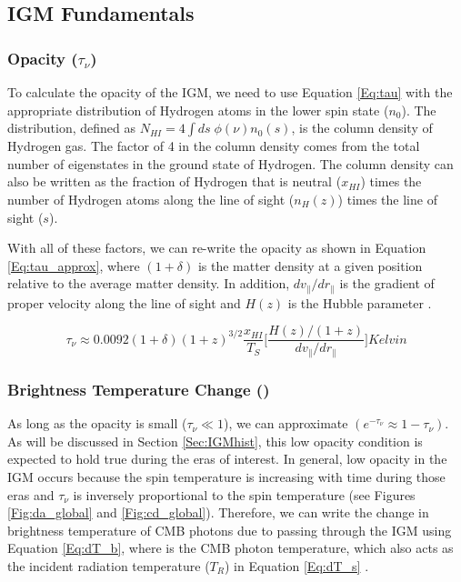 \subsection{IGM Fundamentals}

\subsubsection{Opacity ($\tau_\nu$)}

To calculate the opacity of the IGM, we need to use Equation \ref{Eq:tau} with the appropriate distribution of Hydrogen atoms in the lower spin state ($n_0$). The distribution, defined as $N_{HI} = 4 \int ds \; \phi(\nu) n_0(s)$, is the column density of Hydrogen gas. The factor of 4 in the column density comes from the total number of eigenstates in the ground state of Hydrogen. The column density can also be written as the fraction of Hydrogen that is neutral ($x_{HI}$) times the number of Hydrogen atoms along the line of sight ($n_H (z)$) times the line of sight ($s$).

With all of these factors, we can re-write the opacity as shown in Equation \ref{Eq:tau_approx}, where $(1+\delta)$ is the matter density at a given position relative to the average matter density. In addition, $dv_{\parallel}/dr_{\parallel}$ is the gradient of proper velocity along the line of sight and $H(z)$ is the Hubble parameter \cite{furlanetto_2006}. 

\begin{equation} \label{Eq:tau_approx}
\tau_{\nu} \approx 0.0092 (1+\delta) (1+z)^{3/2} \frac{x_{HI}}{T_S} \Big[ \frac{H(z)/(1+z)}{dv_{\parallel}/dr_{\parallel}} \Big] Kelvin
\end{equation} 



\subsubsection{Brightness Temperature Change (\dtb)}

As long as the opacity is small ($\tau_\nu \ll 1$), we can approximate $(e^{-\tau_\nu} \approx 1-\tau_\nu)$. As will be discussed in Section \ref{Sec:IGMhist}, this low opacity condition is expected to hold true during the eras of interest. In general, low opacity in the IGM occurs because the spin temperature is increasing with time during those eras and $\tau_\nu$ is inversely proportional to the spin temperature (see Figures \ref{Fig:da_global} and \ref{Fig:cd_global}). Therefore, we can write the change in brightness temperature of CMB photons due to passing through the IGM using Equation \ref{Eq:dT_b}, where \tg is the CMB photon temperature, which also acts as the incident radiation temperature ($T_R$) in Equation \ref{Eq:dT_s} \cite{furlanetto_2006}. 


